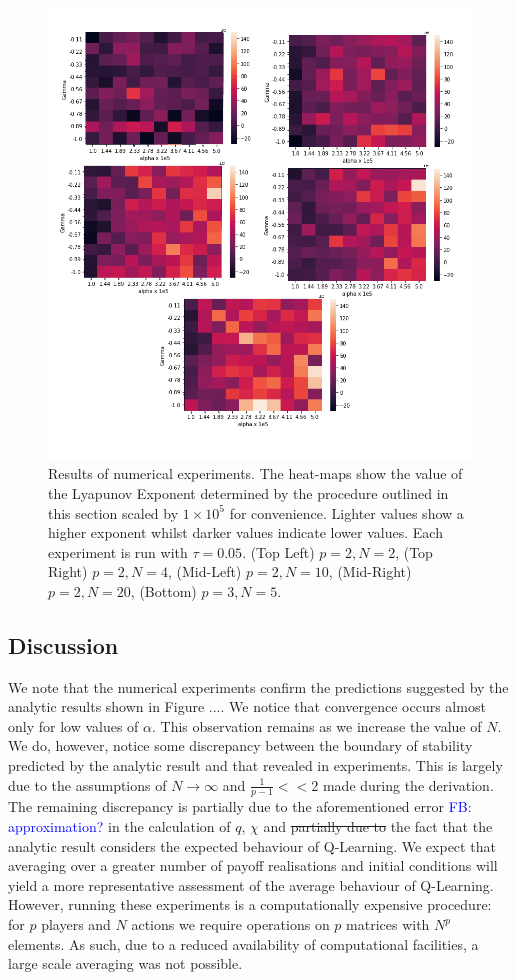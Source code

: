 \documentclass[sigconf,anonymous]{aamas}
\newcommand\fb[1]{\textcolor{blue}{FB: #1}}
\begin{document}
\begin{figure}[t]
    \centering
    \includegraphics[width = 0.9 \linewidth]{Figures/Experiments.png}
    \caption{Results of numerical experiments. The heat-maps show the value of the Lyapunov Exponent determined by the procedure outlined in this section scaled by $1 \times 10^5$ for convenience. Lighter values show a higher exponent whilst darker values indicate lower values. Each experiment is run with $\tau = 0.05$. (Top Left) $p = 2, N = 2$, (Top Right) $p = 2, N = 4$, (Mid-Left) $p = 2, N = 10$, (Mid-Right) $p = 2, N = 20$, (Bottom) $p = 3, N = 5$.}
    \label{fig:NumericalExperiments}
\end{figure}

\subsection{Discussion}

We note that the numerical experiments confirm the predictions suggested by the analytic results shown in Figure .... We notice that convergence occurs almost only for low values of $\alpha$. This observation remains as we increase the value of $N$. We do, however, notice some discrepancy between the boundary of stability predicted by the analytic result and that revealed in experiments. This is largely due to the assumptions of $N \rightarrow \infty$ and $\frac{1}{p-1} << 2$ made during the derivation. The remaining discrepancy is partially due to the aforementioned error \fb{approximation?} in the calculation of $q$, $\chi$ and \st{partially due to} the fact that the analytic result considers the expected behaviour of Q-Learning. We expect that averaging over a greater number of payoff realisations and initial conditions will yield a more representative assessment of the average behaviour of Q-Learning. However, running these experiments is a computationally expensive procedure: for $p$ players and $N$ actions we require operations on $p$ matrices with $N^{p}$ elements. As such, due to a reduced availability of computational facilities, a large scale averaging was not possible.
\end{document}
